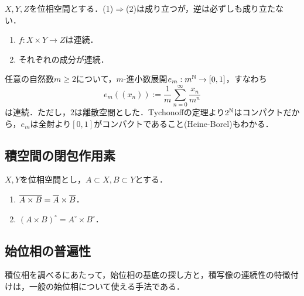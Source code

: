 \documentclass[uplatex,dvipdfmx]{jsreport}
\begin{document}
\begin{proposition}
    $X,Y,Z$を位相空間とする．(1)$\Rightarrow$(2)は成り立つが，逆は必ずしも成り立たない．
    \begin{enumerate}
        \item $f:X\times Y\to Z$は連続．
        \item それぞれの成分が連続．
    \end{enumerate}
\end{proposition}

\begin{example}[$m$-進小数展開]
    任意の自然数$m\ge 2$について，$m$-進小数展開$e_m:m^{\mathbb{N}}\to[0,1]$，すなわち
    \[e_m((x_n)):=\frac{1}{m}\sum^\infty_{n=0}\frac{x_n}{m^n}\]
    は連続．ただし，$2$は離散空間とした．Tychonoffの定理より$2^{\mathbb{N}}$はコンパクトだから，$e_m$は全射より$[0,1]$がコンパクトであること(Heine-Borel)もわかる．
\end{example}

\subsection{積空間の閉包作用素}

\begin{proposition}
    $X,Y$を位相空間とし，$A\subset X,B\subset Y$とする．
    \begin{enumerate}
        \item $\overline{A\times B}=\overline{A}\times\overline{B}$．
        \item $(A\times B)^\circ=A^\circ\times B^\circ$．
    \end{enumerate}
\end{proposition}

\subsection{始位相の普遍性}

\begin{tcolorbox}[colframe=ForestGreen, colback=ForestGreen!10!white,breakable,colbacktitle=ForestGreen!40!white,coltitle=black,fonttitle=\bfseries\sffamily,
title=]
    積位相を調べるにあたって，始位相の基底の探し方と，積写像の連続性の特徴付けは，一般の始位相について使える手法である．
\end{tcolorbox}
\end{document}
